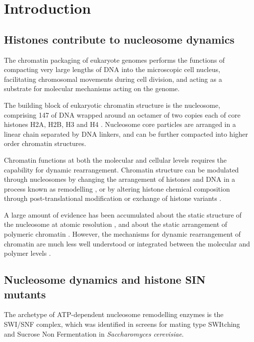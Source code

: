\section{Introduction}

  \subsection{Histones contribute to nucleosome dynamics}

    The chromatin packaging of eukaryote genomes performs the functions of
    compacting very large lengths of DNA into the microscopic cell nucleus,
    facilitating chromosomal movements during cell division,
    and acting as a substrate for molecular mechanisms acting on the genome.

    The building block of eukaryotic chromatin structure is the nucleosome, 
    comprising \SI{147}{\bp} of DNA wrapped around an octamer of two copies each
    of core histones H2A, H2B, H3 and H4 \citep{luger1997crystal}.
    Nucleosome core particles are arranged in a linear chain separated by DNA linkers,
    and can be further compacted into higher order chromatin structures.

    Chromatin functions at both the molecular and cellular levels 
    requires the capability for dynamic rearrangement.
    Chromatin structure can be modulated through nucleosomes
    by changing the arrangement of histones and DNA in a process known as remodelling ,
    or by altering histone chemical composition 
    through post-translational modification  or exchange of histone variants .

    A large amount of evidence has been accumulated about 
    the static structure of the nucleosome at atomic resolution ,
    and about the static arrangement of polymeric chromatin .
    However, the mechanisms for dynamic rearrangement of chromatin
    are much less well understood or integrated between the molecular and polymer levels .

  \subsection{Nucleosome dynamics and histone SIN mutants}

    The archetype of ATP-dependent nucleosome remodelling enzymes is the SWI/SNF complex,
    which was identified in screens for mating type SWItching \citep{SWI-mutants}
    and Sucrose Non Fermentation \citep{SNF-mutants-original-discovery, SNF-mutants2}
    in \textit{Saccharomyces cerevisiae}.

